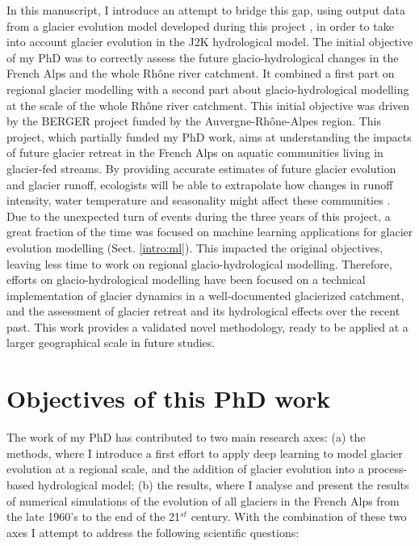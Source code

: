 In this manuscript, I introduce an attempt to bridge this gap, using output data from a glacier evolution model developed during this project \citep{bolibar_alpgm_2020}, in order to take into account glacier evolution in the J2K hydrological model. The initial objective of my PhD was to correctly assess the future glacio-hydrological changes in the French Alps and the whole Rhône river catchment. It combined a first part on regional glacier modelling with a second part about glacio-hydrological modelling at the scale of the whole Rhône river catchment. This initial objective was driven by the BERGER project funded by the Auvergne-Rhône-Alpes region. This project, which partially funded my PhD work, aims at understanding the impacts of future glacier retreat in the French Alps on aquatic communities living in glacier-fed streams. By providing accurate estimates of future glacier evolution and glacier runoff, ecologists will be able to extrapolate how changes in runoff intensity, water temperature and seasonality might affect these communities \citep{robinson_ecosystem_2014, cauvy-fraunie_global_2019}. Due to the unexpected turn of events during the three years of this project, a great fraction of the time was focused on machine learning applications for glacier evolution modelling (Sect. \ref{intro:ml}). This impacted the original objectives, leaving less time to work on regional glacio-hydrological modelling. Therefore, efforts on glacio-hydrological modelling have been focused on a technical implementation of glacier dynamics in a well-documented glacierized catchment, and the assessment of glacier retreat and its hydrological effects over the recent past. This work provides a validated novel methodology, ready to be applied at a larger geographical scale in future studies.

\section*{Objectives of this PhD work}

The work of my PhD has contributed to two main research axes: (a) the methods, where I introduce a first effort to apply deep learning to model glacier evolution at a regional scale, and the addition of glacier evolution into a process-based hydrological model; (b) the results, where I analyse and present the results of numerical simulations of the evolution of all glaciers in the French Alps from the late 1960's to the end of the 21$^{st}$ century. With the combination of these two axes I attempt to address the following scientific questions:
 
